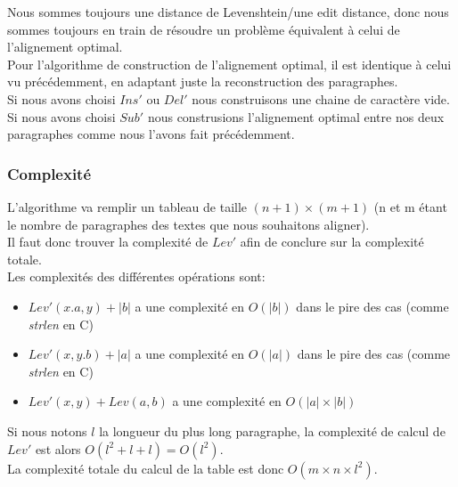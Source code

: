 \documentclass{article}
\begin{document}
Nous sommes toujours une distance de Levenshtein/une edit distance, donc nous
sommes toujours en train de résoudre un problème équivalent à celui de
l'alignement optimal.\\

Pour l'algorithme de construction de l'alignement optimal, il est identique à
celui vu précédemment, en adaptant juste la reconstruction des paragraphes.\\
Si nous avons choisi $Ins'$ ou $Del'$ nous construisons une chaine de caractère
vide.\\
Si nous avons choisi $Sub'$ nous construsions l'alignement optimal entre nos
deux paragraphes comme nous l'avons fait précédemment.

\subsubsection{Complexité}

L'algorithme va remplir un tableau de taille $(n+1) \times (m+1)$ (n et m étant le nombre de
paragraphes des textes que nous souhaitons aligner).\\
Il faut donc trouver la complexité de $Lev'$ afin de conclure sur la complexité
totale.\\
Les complexités des différentes opérations sont:
\begin{itemize}
	\item $Lev'(x.a,y) + \lvert b \rvert$ a une complexité en $O(\lvert b
		\rvert)$ dans le pire des cas (comme \textit{strlen} en C) 
	\item $Lev'(x,y.b) + \lvert a \rvert$ a une complexité en $O(\lvert a
		\rvert)$ dans le pire des cas (comme \textit{strlen} en C) 
	\item $Lev'(x,y) + Lev(a,b)$ a une complexité en $O( \lvert a \rvert \times
		\lvert b \rvert)$
\end{itemize}

Si nous notons $l$ la longueur du plus long paragraphe, la complexité de calcul
de $Lev'$ est alors $O(l^2+l+l) = O(l^2)$.\\
La complexité totale du calcul de la table est donc $O(m \times n \times l^2)$.\\
\end{document}
